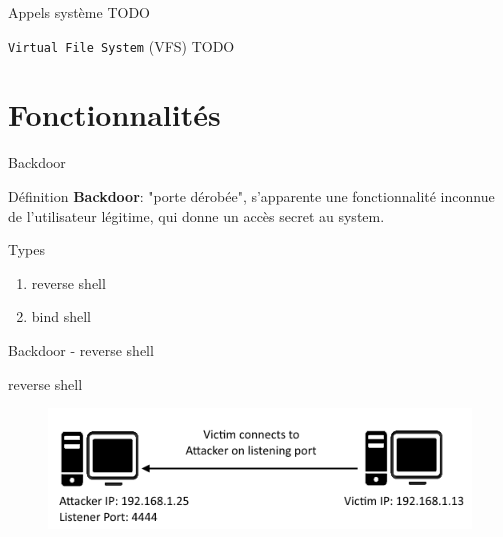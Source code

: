\documentclass[10pt]{beamer}
\begin{document}
	
	\begin{frame}{Appels système}
		TODO
	\end{frame}

	\begin{frame}{\texttt{Virtual File System} (VFS)}
		TODO
	\end{frame}

\section{Fonctionnalités}

\begin{frame}{Backdoor }
	
	\begin{alertblock}{Définition}
		\textbf{Backdoor}: "porte dérobée", s'apparente une fonctionnalité inconnue de l'utilisateur légitime, qui donne un accès secret au system.
    \end{alertblock}
    
	\begin{alertblock}{Types}
		\begin{enumerate}
			\item reverse shell
			\item bind shell
		\end{enumerate}
    \end{alertblock}

\end{frame}

\begin{frame}{Backdoor - reverse shell}
	
	\begin{alertblock}{reverse shell}
		  \begin{figure}
			\begin{center}
				\includegraphics[scale=0.6]{reverse-shell.png}
			\end{center}
  		  \end{figure}
    \end{alertblock}


\end{frame}
\end{document}
